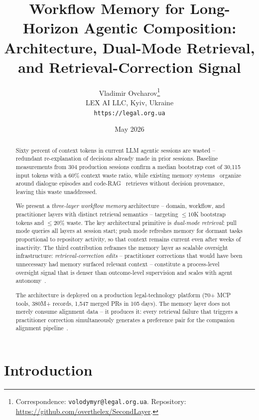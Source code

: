 \documentclass[11pt]{article}
\title{%
  Workflow Memory for Long-Horizon Agentic Composition:\\
  Architecture, Dual-Mode Retrieval, and Retrieval-Correction Signal%
}
\author{
  Vladimir Ovcharov\thanks{Correspondence: \texttt{volodymyr@legal.org.ua}.
    Repository: \url{https://github.com/overthelex/SecondLayer}.}\\
  LEX AI LLC, Kyiv, Ukraine\\
  \texttt{https://legal.org.ua}
}
\date{May 2026}
\begin{document}
\maketitle

\begin{abstract}
Sixty percent of context tokens in current LLM agentic sessions are wasted -- redundant re-explanation of decisions already made in prior sessions.
Baseline measurements from 304 production sessions confirm a median bootstrap cost of 30{,}115 input tokens with a 60\% context waste ratio, while existing memory systems~\citep{packer2023memgpt, park2023generative, chhikara2025mem0} organize around dialogue episodes and code-RAG~\citep{zhang2023repocoder, wang2024coderagbench} retrieves without decision provenance, leaving this waste unaddressed.

We present a \emph{three-layer workflow memory} architecture -- domain, workflow, and practitioner layers with distinct retrieval semantics -- targeting ${\leq}10$K bootstrap tokens and ${\leq}20\%$ waste.
The key architectural primitive is \emph{dual-mode retrieval}: pull mode queries all layers at session start; push mode refreshes memory for dormant tasks proportional to repository activity, so that context remains current even after weeks of inactivity.
The third contribution reframes the memory layer as scalable oversight infrastructure: \emph{retrieval-correction edits} -- practitioner corrections that would have been unnecessary had memory surfaced relevant context -- constitute a process-level oversight signal that is denser than outcome-level supervision and scales with agent autonomy~\citep{ovcharov2026recursive}.

The architecture is deployed on a production legal-technology platform (70+ MCP tools, 380M+ records, 1{,}547 merged PRs in 105 days).
The memory layer does not merely consume alignment data -- it produces it: every retrieval failure that triggers a practitioner correction simultaneously generates a preference pair for the companion alignment pipeline~\citep{ovcharov2026recursive}.
\end{abstract}

\section{Introduction}
\label{sec:intro}
\end{document}
